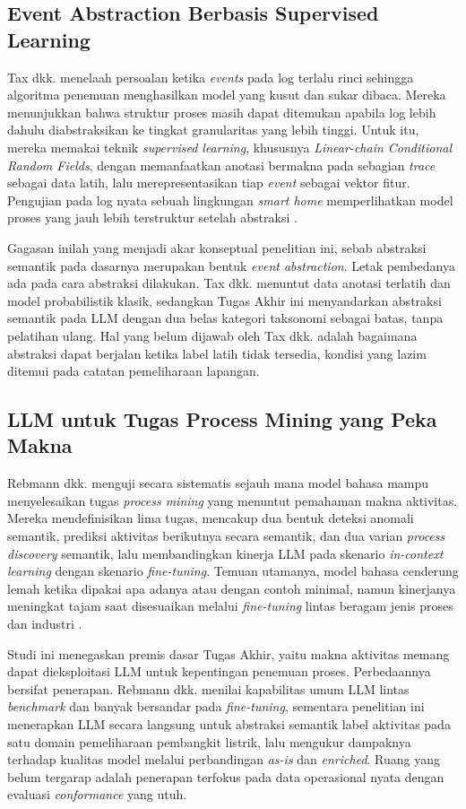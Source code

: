 \subsection{Event Abstraction Berbasis Supervised Learning}
Tax dkk. menelaah persoalan ketika \textit{events} pada log terlalu rinci sehingga algoritma penemuan menghasilkan model yang kusut dan sukar dibaca. Mereka menunjukkan bahwa struktur proses masih dapat ditemukan apabila log lebih dahulu diabstraksikan ke tingkat granularitas yang lebih tinggi. Untuk itu, mereka memakai teknik \textit{supervised learning}, khususnya \textit{Linear-chain Conditional Random Fields}, dengan memanfaatkan anotasi bermakna pada sebagian \textit{trace} sebagai data latih, lalu merepresentasikan tiap \textit{event} sebagai vektor fitur. Pengujian pada log nyata sebuah lingkungan \textit{smart home} memperlihatkan model proses yang jauh lebih terstruktur setelah abstraksi \cite{tax2016event}.

Gagasan inilah yang menjadi akar konseptual penelitian ini, sebab abstraksi semantik pada dasarnya merupakan bentuk \textit{event abstraction}. Letak pembedanya ada pada cara abstraksi dilakukan. Tax dkk. menuntut data anotasi terlatih dan model probabilistik klasik, sedangkan Tugas Akhir ini menyandarkan abstraksi semantik pada LLM dengan dua belas kategori taksonomi sebagai batas, tanpa pelatihan ulang. Hal yang belum dijawab oleh Tax dkk. adalah bagaimana abstraksi dapat berjalan ketika label latih tidak tersedia, kondisi yang lazim ditemui pada catatan pemeliharaan lapangan.

\subsection{LLM untuk Tugas Process Mining yang Peka Makna}
Rebmann dkk. menguji secara sistematis sejauh mana model bahasa mampu menyelesaikan tugas \textit{process mining} yang menuntut pemahaman makna aktivitas. Mereka mendefinisikan lima tugas, mencakup dua bentuk deteksi anomali semantik, prediksi aktivitas berikutnya secara semantik, dan dua varian \textit{process discovery} semantik, lalu membandingkan kinerja LLM pada skenario \textit{in-context learning} dengan skenario \textit{fine-tuning}. Temuan utamanya, model bahasa cenderung lemah ketika dipakai apa adanya atau dengan contoh minimal, namun kinerjanya meningkat tajam saat disesuaikan melalui \textit{fine-tuning} lintas beragam jenis proses dan industri \cite{rebmann2025semantics}.

Studi ini menegaskan premis dasar Tugas Akhir, yaitu makna aktivitas memang dapat dieksploitasi LLM untuk kepentingan penemuan proses. Perbedaannya bersifat penerapan. Rebmann dkk. menilai kapabilitas umum LLM lintas \textit{benchmark} dan banyak bersandar pada \textit{fine-tuning}, sementara penelitian ini menerapkan LLM secara langsung untuk abstraksi semantik label aktivitas pada satu domain pemeliharaan pembangkit listrik, lalu mengukur dampaknya terhadap kualitas model melalui perbandingan \textit{as-is} dan \textit{enriched}. Ruang yang belum tergarap adalah penerapan terfokus pada data operasional nyata dengan evaluasi \textit{conformance} yang utuh.

